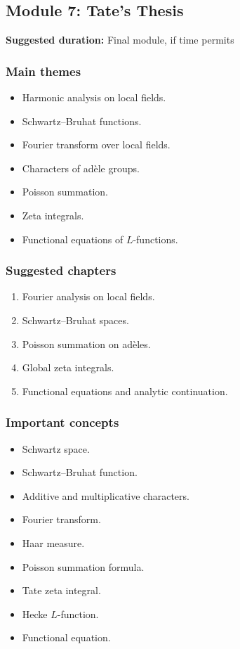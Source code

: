 \documentclass[11pt]{article}
\begin{document}
\subsection{Module 7: Tate's Thesis}

\textbf{Suggested duration:} Final module, if time permits

\subsubsection*{Main themes}

\begin{itemize}
    \item Harmonic analysis on local fields.
    \item Schwartz--Bruhat functions.
    \item Fourier transform over local fields.
    \item Characters of adèle groups.
    \item Poisson summation.
    \item Zeta integrals.
    \item Functional equations of \(L\)-functions.
\end{itemize}

\subsubsection*{Suggested chapters}

\begin{enumerate}
    \item Fourier analysis on local fields.
    \item Schwartz--Bruhat spaces.
    \item Poisson summation on adèles.
    \item Global zeta integrals.
    \item Functional equations and analytic continuation.
\end{enumerate}

\subsubsection*{Important concepts}

\begin{itemize}
    \item Schwartz space.
    \item Schwartz--Bruhat function.
    \item Additive and multiplicative characters.
    \item Fourier transform.
    \item Haar measure.
    \item Poisson summation formula.
    \item Tate zeta integral.
    \item Hecke \(L\)-function.
    \item Functional equation.
\end{itemize}
\end{document}
